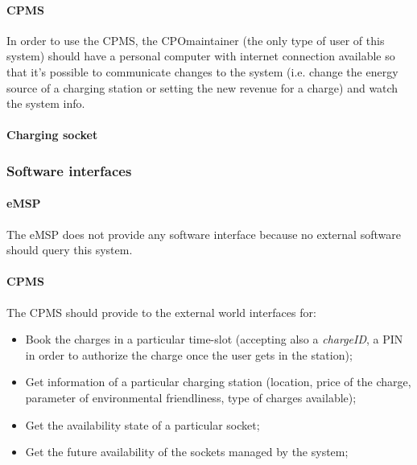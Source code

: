 \paragraph{\ac{CPMS}}
In order to use the \ac{CPMS}, the \ac{CPO}maintainer (the only type of user of this system) should have a personal computer with internet connection available so that it's possible to communicate changes to the system (i.e. change the energy source of a charging station or setting the new revenue for a charge) and watch the system info.

\paragraph{Charging socket}


\subsubsection{Software interfaces}
\paragraph{\ac{eMSP}}
The \ac{eMSP} does not provide any software interface because no external software should query this system.


\paragraph{\ac{CPMS}}
The \ac{CPMS} should provide to the external world interfaces for:
\begin{itemize}
    \item Book the charges in a particular time-slot (accepting also a \textit{chargeID}, a PIN in order to authorize the charge once the user gets in the station);
    \item Get information of a particular charging station (location, price of the charge, parameter of environmental friendliness, type of charges available);
    \item Get the availability state of a particular socket;
    \item Get the future availability of the sockets managed by the system;
\end{itemize}

